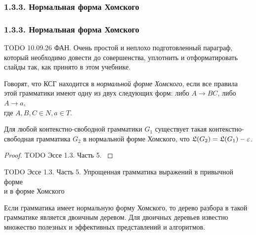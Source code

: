 \documentclass[mathserif,12pt,aspectratio=169]{beamer}
\renewcommand{\index}[1]{}
\def\odmkey#1#2{{\it\color{red} #1}\index{#2}}
\def\TODO#1{{\color{gray} TODO {#1}}}
\begin{document}
\subsubsection{1.3.3. Нормальная форма Хомского}\label{1.3.3.}
\begin{frame}
\frametitle{1.3.3. Нормальная форма Хомского}
%
%
%
%

\TODO{10.09.26 ФАН. Очень простой и неплохо подготовленный параграф, который необходимо довести до совершенства,
уплотнить и отформатировать слайды так, как принято в этом учебнике. }

Говорят, что КСГ находится в 
\odmkey{нормальной форме Хомского}{Нормальная форма!Хомского}, если все правила этой грамматики
имеют одну из двух следующих форм: 
либо $A\to BC$, либо $A\to a$, \\где $A, B, C \in N, a\in T$. 


\begin{theorem}
Для любой контекстно-свободной грамматики $G_1$
существует такая контекст\-но-свободная грамматика $G_2$
в нормальной форме Хомского,
что  $\frak{L}(G_2)=\frak{L}(G_1)-\varepsilon$.
\end{theorem}
\begin{proof}
\TODO{Эссе 1.3. Часть 5. }
\end{proof}

\begin{example}
\TODO{Эссе 1.3. Часть 5. Упрощенная грамматика выражений в привычной форме\\ и в форме Хомского
}
\end{example}

\medskip
\begin{remark}
Если грамматика имеет нормальную форму Хомского,
то дерево разбора в такой грамматике
является двоичным деревом. Для 
двоичных деревьев известно множество
полезных и эффективных представлений и алгоритмов.
\end{remark}

\end{frame}
\end{document}
